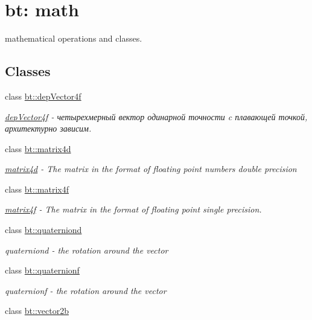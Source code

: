 \hypertarget{group__math}{\section{bt\-: math}
\label{group__math}
}


mathematical operations and classes.  


\subsection*{Classes}
\begin{DoxyCompactItemize}
\item 
class \hyperlink{classbt_1_1dep_vector4f}{bt\-::dep\-Vector4f}
\begin{DoxyCompactList}\small\item\em \hyperlink{classbt_1_1dep_vector4f}{dep\-Vector4f} -\/ четырехмерный вектор одинарной точности c плавающей точкой, архитектурно зависим. \end{DoxyCompactList}\item 
class \hyperlink{classbt_1_1matrix4d}{bt\-::matrix4d}
\begin{DoxyCompactList}\small\item\em \hyperlink{classbt_1_1matrix4d}{matrix4d} -\/ The matrix in the format of floating point numbers double precision \end{DoxyCompactList}\item 
class \hyperlink{classbt_1_1matrix4f}{bt\-::matrix4f}
\begin{DoxyCompactList}\small\item\em \hyperlink{classbt_1_1matrix4f}{matrix4f} -\/ The matrix in the format of floating point single precision. \end{DoxyCompactList}\item 
class \hyperlink{classbt_1_1quaterniond}{bt\-::quaterniond}
\begin{DoxyCompactList}\small\item\em quaterniond -\/ the rotation around the vector \end{DoxyCompactList}\item 
class \hyperlink{classbt_1_1quaternionf}{bt\-::quaternionf}
\begin{DoxyCompactList}\small\item\em quaternionf -\/ the rotation around the vector \end{DoxyCompactList}\item 
class \hyperlink{classbt_1_1vector2b}{bt\-::vector2b}

\end{DoxyCompactItemize}
